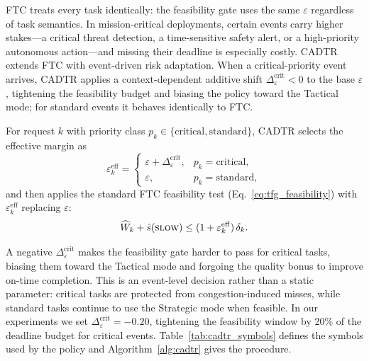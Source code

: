 \documentclass[fleqn,12pt,lineno]{wlpeerj}
\begin{document}
FTC treats every task identically: the feasibility gate uses the same $\varepsilon$ regardless of task semantics. In mission-critical deployments, certain events carry higher stakes---a critical threat detection, a time-sensitive safety alert, or a high-priority autonomous action---and missing their deadline is especially costly. CADTR extends FTC with event-driven risk adaptation. When a critical-priority event arrives, CADTR applies a context-dependent additive shift $\Delta_{\varepsilon}^{\mathrm{crit}} < 0$ to the base $\varepsilon$, tightening the feasibility budget and biasing the policy toward the Tactical mode; for standard events it behaves identically to FTC.

For request $k$ with priority class $p_k \in \{\text{critical}, \text{standard}\}$, CADTR selects the effective margin as
\begin{equation}
\varepsilon_k^{\mathrm{eff}} =
\begin{cases}
\varepsilon + \Delta_{\varepsilon}^{\mathrm{crit}}, & p_k = \text{critical},\\
\varepsilon, & p_k = \text{standard},
\end{cases}
\label{eq:cadtr_eps_shift}
\end{equation}
and then applies the standard FTC feasibility test (Eq.~\eqref{eq:tfg_feasibility}) with $\varepsilon_k^{\mathrm{eff}}$ replacing $\varepsilon$:
\begin{equation}
\widehat{W}_k + \hat{s}(\textsc{slow}) \le (1+\varepsilon_k^{\mathrm{eff}})\,\delta_k.
\label{eq:cadtr_feasibility}
\end{equation}

A negative $\Delta_{\varepsilon}^{\mathrm{crit}}$ makes the feasibility gate harder to pass for critical tasks, biasing them toward the Tactical mode and forgoing the quality bonus to improve on-time completion. This is an event-level decision rather than a static parameter: critical tasks are protected from congestion-induced misses, while standard tasks continue to use the Strategic mode when feasible. In our experiments we set $\Delta_{\varepsilon}^{\mathrm{crit}} = -0.20$, tightening the feasibility window by 20\% of the deadline budget for critical events. Table~\ref{tab:cadtr_symbols} defines the symbols used by the policy and Algorithm~\ref{alg:cadtr} gives the procedure.
\end{document}
